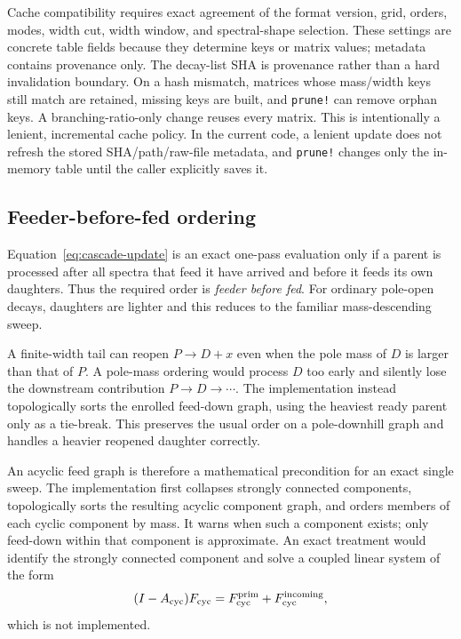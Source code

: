 \documentclass[11pt]{article}
\begin{document}
Cache compatibility requires exact agreement of the format version, grid,
orders, modes, width cut, width window, and spectral-shape selection.  These
settings are concrete table fields because they determine keys or matrix values;
metadata contains provenance only.  The decay-list SHA is provenance rather
than a hard invalidation boundary.  On a hash mismatch, matrices whose
mass/width keys still match are retained, missing keys are built, and
\texttt{prune!} can remove orphan keys.  A branching-ratio-only change reuses
every matrix.
This is intentionally a lenient, incremental cache policy.  In the current
code, a lenient update does not refresh the stored SHA/path/raw-file metadata,
and \texttt{prune!} changes only the in-memory table until the caller
explicitly saves it.

\subsection{Feeder-before-fed ordering}

Equation~\eqref{eq:cascade-update} is an exact one-pass evaluation only if a
parent is processed after all spectra that feed it have arrived and before it
feeds its own daughters.  Thus the required order is \emph{feeder before
fed}.  For ordinary pole-open decays, daughters are lighter and this reduces
to the familiar mass-descending sweep.

A finite-width tail can reopen $P\to D+x$ even when the pole mass of $D$ is
larger than that of $P$.  A pole-mass ordering would process $D$ too early and
silently lose the downstream contribution $P\to D\to\cdots$.  The
implementation instead topologically sorts the enrolled feed-down graph,
using the heaviest ready parent only as a tie-break.  This preserves the
usual order on a pole-downhill graph and handles a heavier reopened daughter
correctly.

An acyclic feed graph is therefore a mathematical precondition for an exact
single sweep.  The implementation first collapses strongly connected
components, topologically sorts the resulting acyclic component graph, and
orders members of each cyclic component by mass.  It warns when such a
component exists; only feed-down within that component is approximate.
An exact treatment would identify the strongly connected component and solve
a coupled linear system of the form
\begin{equation}
 (I-A_{\rm cyc})F_{\rm cyc}
 =F^{\rm prim}_{\rm cyc}+F^{\rm incoming}_{\rm cyc},
\end{equation}
which is not implemented.
\end{document}
